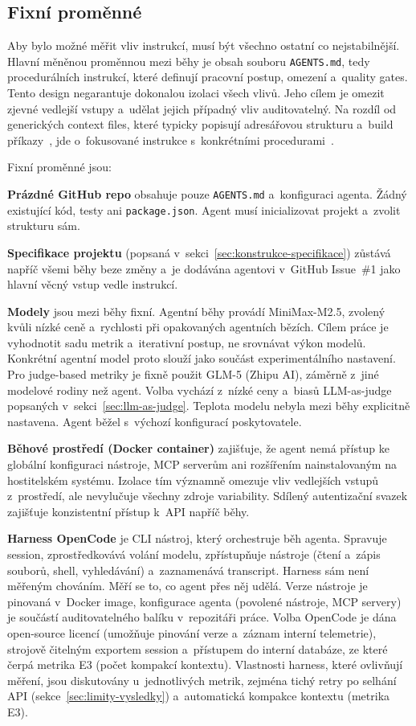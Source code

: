 \subsection{Fixní proměnné}
\label{sec:fixni-promenne}

Aby bylo možné měřit vliv instrukcí, musí být všechno ostatní
co nejstabilnější. Hlavní měněnou proměnnou mezi běhy je obsah
souboru \texttt{AGENTS.md}, tedy procedurálních instrukcí, které
definují pracovní postup, omezení a~quality gates. Tento design
negarantuje dokonalou izolaci všech vlivů. Jeho cílem je omezit
zjevné vedlejší vstupy a~udělat jejich případný vliv auditovatelný.
Na rozdíl od generických context files,
které typicky popisují adresářovou strukturu a~build
příkazy~\cite{gloaguen2025agentsmd}, jde o~fokusované instrukce
s~konkrétními procedurami~\cite{skillsbench2025}.

Fixní proměnné jsou:

\textbf{Prázdné GitHub repo} obsahuje pouze \texttt{AGENTS.md}
a~konfiguraci agenta. Žádný existující kód, testy ani
\texttt{package.json}. Agent musí inicializovat projekt
a~zvolit strukturu sám.

\textbf{Specifikace projektu} (popsaná v~sekci~\ref{sec:konstrukce-specifikace})
zůstává napříč všemi běhy beze změny a~je dodávána agentovi
v~GitHub Issue~\#1 jako hlavní věcný vstup vedle instrukcí.

\textbf{Modely} jsou mezi běhy fixní. Agentní běhy provádí
MiniMax-M2.5, zvolený kvůli nízké ceně a~rychlosti při opakovaných
agentních bězích. Cílem práce je vyhodnotit sadu metrik a~iterativní
postup, ne srovnávat výkon modelů. Konkrétní agentní model proto
slouží jako součást experimentálního nastavení. Pro judge-based
metriky je fixně použit GLM-5 (Zhipu AI), záměrně z~jiné modelové
rodiny než agent. Volba vychází z~nízké ceny a~biasů LLM-as-judge
popsaných v~sekci~\ref{sec:llm-as-judge}.
Teplota modelu nebyla mezi běhy explicitně nastavena. Agent běžel
s~výchozí konfigurací poskytovatele.

\textbf{Běhové prostředí (Docker container)} zajišťuje, že agent
nemá přístup ke globální konfiguraci nástroje, MCP serverům ani
rozšířením nainstalovaným na hostitelském systému. Izolace tím
významně omezuje vliv vedlejších vstupů z~prostředí, ale
nevylučuje všechny zdroje variability. Sdílený
autentizační svazek zajišťuje konzistentní přístup k~API napříč
běhy.

\textbf{Harness OpenCode} je CLI nástroj, který orchestruje běh
agenta. Spravuje session, zprostředkovává volání modelu, zpřístupňuje
nástroje (čtení a~zápis souborů, shell, vyhledávání) a~zaznamenává
transcript. Harness sám není měřeným chováním. Měří se to, co agent
přes něj udělá. Verze nástroje je pinovaná v~Docker image, konfigurace
agenta (povolené nástroje, MCP servery) je součástí auditovatelného
balíku v~repozitáři práce. Volba OpenCode je dána open-source
licencí (umožňuje pinování verze a~záznam interní telemetrie),
strojově čitelným exportem session a~přístupem do interní databáze,
ze které čerpá metrika \acs{E3} (počet kompakcí kontextu).
Vlastnosti harness, které ovlivňují měření, jsou diskutovány
u~jednotlivých metrik, zejména tichý retry po selhání API
(sekce~\ref{sec:limity-vysledky}) a~automatická kompakce kontextu
(metrika \acs{E3}).

